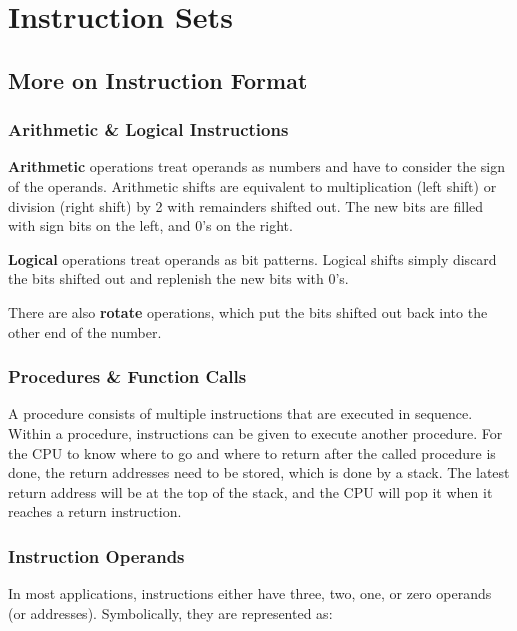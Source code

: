\section{Instruction Sets}

\subsection{More on Instruction Format}
\label{sec:instruction-format-extended}

\subsubsection{Arithmetic \& Logical Instructions}

\textbf{Arithmetic} operations treat operands as numbers and have to consider the sign
of the operands. Arithmetic shifts are equivalent to multiplication (left shift) or
division (right shift) by 2 with remainders shifted out. The new bits are filled with
sign bits on the left, and 0's on the right.

\textbf{Logical} operations treat operands as bit patterns. Logical shifts simply discard
the bits shifted out and replenish the new bits with 0's.

There are also \textbf{rotate} operations, which put the bits shifted out back into the
other end of the number.

\subsubsection{Procedures \& Function Calls}

A procedure consists of multiple instructions that are executed in sequence. Within
a procedure, instructions can be given to execute another procedure. For the CPU
to know where to go and where to return after the called procedure is done, the
return addresses need to be stored, which is done by a stack. The latest return
address will be at the top of the stack, and the CPU will pop it when it reaches
a return instruction.

\subsubsection{Instruction Operands}

In most applications, instructions either have three, two, one, or zero operands
(or addresses). Symbolically, they are represented as:

